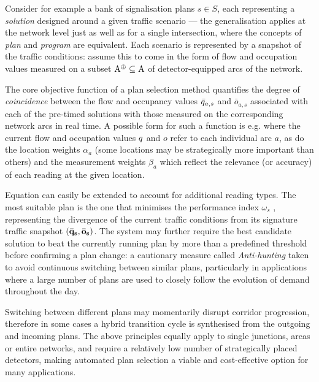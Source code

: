 Consider for example a bank of signalisation plans $s \in S$, each representing a \emph{solution} designed around a given traffic scenario — the generalisation applies at the network level just as well as for a single intersection, where the concepts of \emph{plan} and \emph{program} are equivalent.
Each scenario is represented by a snapshot of the traffic conditions: assume this to come in the form of flow and occupation values measured on a subset $\mathrm{A}^\oplus \subseteq \mathrm{A}$ of detector-equipped arcs of the network.

The core objective function of a plan selection method quantifies the degree of
\emph{coincidence} between the flow and occupancy values $\bar{q}_{a,s}$ and $\bar{o}_{a,s}$ associated with each of the pre-timed solutions with those measured on the corresponding network arcs in real time. A possible form for such a function is e.g.
where the current flow and occupation values $q$ and $o$ refer to each individual arc $a$, as do the location weights $\alpha_a$ (some locations may be strategically more important than others) and the measurement weights $\beta_a$ which reflect the relevance (or accuracy) of each reading at the given location.

Equation  can easily be extended to account for additional reading types.
The most suitable plan is the one that minimises the performance index $\omega_s$ , representing the divergence of the current traffic conditions from its signature traffic snapshot $(\mathbf{\bar{q}_s}, \mathbf{\bar{o}_s})$.
The system may further require the best candidate solution to beat the currently running
plan by more than a predefined threshold before confirming a plan change: a cautionary
measure called \emph{Anti-hunting} taken to avoid continuous switching between similar plans,
particularly in applications where a large number of plans are used to closely follow the
evolution of demand throughout the day.

Switching between different plans may momentarily disrupt corridor progression, therefore in
some cases a hybrid transition cycle is synthesised from the outgoing and incoming plans.
The above principles equally apply to single junctions, areas or entire networks, and require a
relatively low number of strategically placed detectors, making automated plan selection a
viable and cost-effective option for many applications.
 

